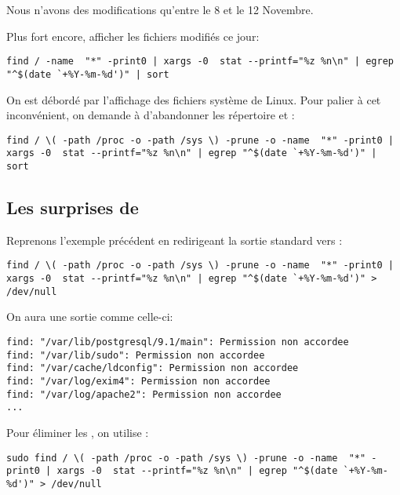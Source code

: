 Nous n'avons des modifications qu'entre le 8 et le 12 Novembre.

Plus fort encore, afficher les fichiers modifiés ce jour:

\begin{lstlisting}[caption=recherche d'une attaque part IV]
find / -name  "*" -print0 | xargs -0  stat --printf="%z %n\n" | egrep "^$(date `+%Y-%m-%d')" | sort
\end{lstlisting}

On est débordé par l'affichage des fichiers système de Linux. Pour palier à cet inconvénient, on demande à  d'abandonner les répertoire  et :

\begin{lstlisting}[caption=recherche d'une attaque part V et fin]
find / \( -path /proc -o -path /sys \) -prune -o -name  "*" -print0 | xargs -0  stat --printf="%z %n\n" | egrep "^$(date `+%Y-%m-%d')" | sort
\end{lstlisting}

\subsection{Les surprises de }
Reprenons l'exemple précédent en redirigeant la sortie standard vers :

\begin{lstlisting}[caption=avec redirection]
find / \( -path /proc -o -path /sys \) -prune -o -name  "*" -print0 | xargs -0  stat --printf="%z %n\n" | egrep "^$(date `+%Y-%m-%d')" > /dev/null
\end{lstlisting}

On aura une sortie comme celle-ci:

\begin{lstlisting}[caption=problèmes de droits part I]
find: "/var/lib/postgresql/9.1/main": Permission non accordee
find: "/var/lib/sudo": Permission non accordee
find: "/var/cache/ldconfig": Permission non accordee
find: "/var/log/exim4": Permission non accordee
find: "/var/log/apache2": Permission non accordee
...
\end{lstlisting}

Pour éliminer les , on utilise :

\begin{lstlisting}[caption=problèmes de droits part I en pire]
sudo find / \( -path /proc -o -path /sys \) -prune -o -name  "*" -print0 | xargs -0  stat --printf="%z %n\n" | egrep "^$(date `+%Y-%m-%d')" > /dev/null
\end{lstlisting}

